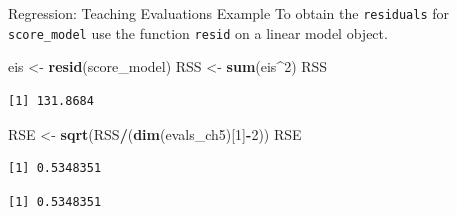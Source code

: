 \documentclass[
  ignorenonframetext,
]{beamer}
\newenvironment{Shaded}{\begin{snugshade}}{\end{snugshade}}
\newcommand{\CommentTok}[1]{\textcolor[rgb]{0.56,0.35,0.01}{\textit{#1}}}
\newcommand{\DecValTok}[1]{\textcolor[rgb]{0.00,0.00,0.81}{#1}}
\newcommand{\FunctionTok}[1]{\textcolor[rgb]{0.13,0.29,0.53}{\textbf{#1}}}
\newcommand{\NormalTok}[1]{#1}
\newcommand{\OtherTok}[1]{\textcolor[rgb]{0.56,0.35,0.01}{#1}}
\newcommand{\SpecialCharTok}[1]{\textcolor[rgb]{0.81,0.36,0.00}{\textbf{#1}}}
\begin{document}
\begin{frame}[fragile]{Regression: Teaching Evaluations Example}
\protect\hypertarget{regression-teaching-evaluations-example-9}{}
To obtain the \texttt{residuals} for \texttt{score\_model} use the
function \texttt{resid} on a linear model object.

\normalsize

\begin{Shaded}
\begin{Highlighting}[]
\NormalTok{eis }\OtherTok{\textless{}{-}} \FunctionTok{resid}\NormalTok{(score\_model)}
\NormalTok{RSS }\OtherTok{\textless{}{-}} \FunctionTok{sum}\NormalTok{(eis}\SpecialCharTok{\^{}}\DecValTok{2}\NormalTok{)}
\NormalTok{RSS}
\end{Highlighting}
\end{Shaded}

\begin{verbatim}
[1] 131.8684
\end{verbatim}

\begin{Shaded}
\begin{Highlighting}[]
\NormalTok{RSE }\OtherTok{\textless{}{-}} \FunctionTok{sqrt}\NormalTok{(RSS}\SpecialCharTok{/}\NormalTok{(}\FunctionTok{dim}\NormalTok{(evals\_ch5)[}\DecValTok{1}\NormalTok{]}\SpecialCharTok{{-}}\DecValTok{2}\NormalTok{))}
\NormalTok{RSE}
\end{Highlighting}
\end{Shaded}

\begin{verbatim}
[1] 0.5348351
\end{verbatim}

\begin{Shaded}
\end{Shaded}

\begin{verbatim}
[1] 0.5348351
\end{verbatim}

\normalsize
\end{frame}
\end{document}
